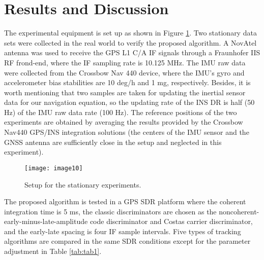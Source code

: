 \documentclass{article}
\newcommand{\reffig}[1]{Figure \ref{#1}}
\begin{document}
\section{Results and Discussion}\label{sec3}

The experimental equipment is set up as shown in \reffig{fig:fig5}. Two stationary data sets were collected in the real world to verify the proposed algorithm. A NovAtel antenna was used to receive the GPS L1 C/A IF signals through a Fraunhofer IIS RF frond-end, where the IF sampling rate is 10.125 MHz. The IMU raw data were collected from the Crossbow Nav 440 device, where the IMU's gyro and accelerometer bias stabilities are 10 deg/h and 1 mg, respectively. Besides, it is worth mentioning that two samples are taken for updating the inertial sensor data for our navigation equation, so the updating rate of the INS DR is half (50 Hz) of the IMU raw data rate (100 Hz). The reference positions of the two experiments are obtained by averaging the results provided by the Crossbow Nav440 GPS/INS integration solutions (the centers of the IMU sensor and the GNSS antenna are sufficiently close in the setup and neglected in this experiment). 

\begin{figure}[htbp]%
\centerline{\texttt{[image: image10]}}
\caption{Setup for the stationary experiments. }
\label{fig:fig5}
\end{figure}

The proposed algorithm is tested in a GPS SDR platform where the coherent integration time is 5 ms, the classic discriminators are chosen as the noncoherent-early-minus-late-amplitude code discriminator and Costas carrier discriminator, and the early-late spacing is four IF sample intervals. Five types of tracking algorithms are compared in the same SDR conditions except for the parameter adjustment in Table \ref{tab:tab1}. 
\end{document}
